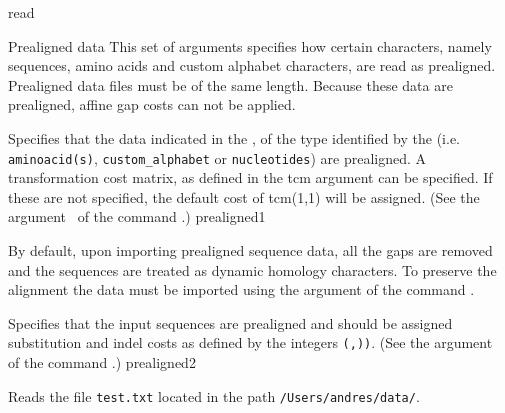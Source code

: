 \begin{command}{read}{}
\begin{arguments}
\begin{argumentgroup}{Prealigned data}
This set of arguments specifies how certain characters, namely sequences, amino acids 
and custom alphabet characters, are read as prealigned. Prealigned data files must be of the same length.
Because these data are prealigned, affine gap costs can not be applied.

{Specifies that the data indicated in the \poystring, of the type identified by the \poylident (i.e. 
\texttt{aminoacid(s)}, \texttt{custom\_alphabet} or \texttt{nucleotides}) are prealigned.
A transformation cost matrix, as defined in the tcm \poystring argument can be specified. 
If these are not specified, the default cost of tcm(1,1) will be assigned. (See the argument~ 
of the command .)}
{prealigned1}

\begin{statement}
By default, upon importing prealigned sequence data, all the gaps are
removed and the sequences are treated as dynamic homology characters.
To preserve the alignment the data must be imported using the
 argument of the command .
\end{statement}

{Specifies that the input sequences are prealigned and should be
assigned substitution and indel costs as defined by the
 integers \texttt{(\poyint,\poyint))}. (See the 
argument~ 
of the command .)}
{prealigned2}

\end{argumentgroup}

\end{arguments}


\begin{poyexamples}

{Reads the file \texttt{test.txt} located in the path
\texttt{/Users/andres/data/}.}


\end{poyexamples}
\end{command}
